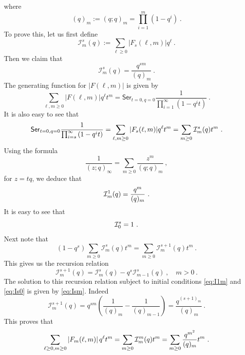 \documentclass[a4paper,10pt]{article}
\newcommand{\mr}[1]{\mathsf{#1}}
\def\CI {{\cal I}}
\def\CI {{{\cal I}}}
\begin{document}
where 
\begin{equation}
    (q)_m:=(q;q)_m=\prod_{i=1}^m(1-q^i)~.
\end{equation}
To prove this, let us first define 
\begin{equation}
\label{def:Ism}
\mathcal{I}_m^s(q):=\sum_{\ell \geq 0}\left|F_s(\ell, m)\right| q^\ell~.
\end{equation}
Then we claim that
\begin{equation}\label{eq:Ism}
\mathcal{I}_m^s(q)=\frac{q^{sm}}{(q)_m}~.
\end{equation}
The generating function for $|F(\ell,m)|$ is given by 
\begin{equation}
    \sum_{\ell,m\geq 0}|F(\ell,m)|q^\ell t^m=\mr{Ser}_{t=0, q=0} \frac{1}{\prod_{i=1}^{\infty}\left(1-q^it\right)}~.
\end{equation}
It is also easy to see that 
\begin{equation}\label{eq:free_gen_ser_A1A4}
\mr{Ser}_{t=0, q=0} \frac{1}{\prod_{i=s}^{\infty}\left(1-q^it\right)}=\sum_{\ell,m\geq 0}|F_s(\ell,m)|q^\ell t^m=\sum_{m\geq 0}\CI_m^s(q)t^m~.    
\end{equation}
Using the formula 
\begin{equation}
    \frac{1}{(z;q)_\infty}=\sum_{m\geq 0}\frac{z^m}{(q;q)_m}~,
\end{equation}
for $z=tq$, we deduce that 
\begin{equation}\label{eq:I1m}
    \CI^1_{m}(q)=\frac{q^m}{(q)_m}~.
\end{equation}
It is easy to see that 
\begin{equation}\label{eq:Is0}
    \CI^s_0=1~.
\end{equation}
Next note that 
\begin{equation}
 \left(1-q^s\right) \sum_{m \geq 0} \mathcal{I}_m^s(q) t^m=\sum_{m \geq 0} \mathcal{I}_m^{s+1}(q) t^m ~.  
\end{equation}
This gives us the recursion relation
\begin{equation}
\mathcal{I}_m^{s+1}(q)=\mathcal{I}_m^s(q)-q^s \mathcal{I}_{m-1}^s(q)~,\quad m>0~.
\end{equation}
The solution to this recursion relation subject to initial conditions \eqref{eq:I1m} and \eqref{eq:Is0} is given by \eqref{eq:Ism}. Indeed
\begin{equation}
\mathcal{I}_m^{s+1}(q)=q^{s m}\left(\frac{1}{(q)_m}-\frac{1}{(q)_{m-1}}\right)=\frac{q^{(s+1)_m}}{(q)_m}~.
\end{equation}
This proves that 
\begin{equation}\label{eq:Hil_A1A2}
\sum_{\ell \geq 0, m \geq 0}\left|F_m(\ell, m)\right| q^\ell t^m=\sum_{m\geq 0}\CI_m^m(q)t^m=\sum_{m \geq 0} \frac{q^{m^2}}{(q)_m} t^m~.    
\end{equation}
\end{document}
